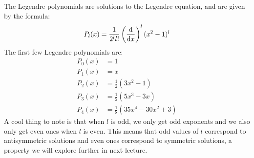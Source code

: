 \begin{definition*}{}
		The Legendre polynomials are solutions to the Legendre equation, and are given by the formula:
		\[ P_l(x) = \frac{1}{2^ll!}\left( \dv{x} \right)^l (x^2 - 1)^l\]
		The first few Legendre polynomials are: 
		\begin{align*}
				P_0(x) &= 1\\
				P_1(x) &= x\\
				P_2(x) &= \frac{1}{2}(3x^2 -1)\\
				P_3(x) &= \frac{1}{2}(5x^3 - 3x)\\
				P_4(x) &= \frac{1}{8}(35x^4 - 30x^2 + 3)
		\end{align*}
		A cool thing to note is that when $l$ is odd, we only get odd exponents and we also only get even ones 
		when $l$ is even. This means that odd values of $l$ correspond to antisymmetric solutions and even ones
		correspond to symmetric solutions, a property we will explore further in next lecture.
\end{definition*}


